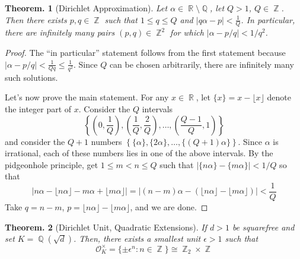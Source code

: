 \documentclass[11pt, a4paper]{memoir}
\DeclareMathOperator{\Q}{{\mathbb{Q}}}
\DeclareMathOperator{\Z}{{\mathbb{Z}}}
\DeclareMathOperator{\R}{{\mathbb{R}}}
\theoremstyle{change}
\newtheorem{theorem}{Theorem.}[section]
\theoremstyle{plain}
\theoremstyle{nonumberplain}
\newtheorem{proof}{Proof}
\numberwithin{equation}{section}
\begin{document}
\begin{theorem}[Dirichlet Approximation]\label{t:dir-approx}
    Let $\alpha\in\R\setminus\Q$, let $Q>1$, $Q\in\Z$.
    Then there exists $p,q\in\Z$ such that $1\leq q\leq Q$ and $|q\alpha-p|<\frac{1}{Q}$.
    In particular, there are infinitely many pairs $(p,q)\in\Z^2$ for which $|\alpha-p/q|<1/q^2$.
\end{theorem}
\begin{proof}
    The ``in particular'' statement follows from the first statement because $|\alpha-p/q|<\frac{1}{Qq}\leq\frac{1}{q^2}$.
    Since $Q$ can be chosen arbitrarily, there are infinitely many such solutions.

    Let's now prove the main statement.
    For any $x\in\R$, let $\{x\}=x-\lfloor x\rfloor$ denote the integer part of $x$.
    Consider the $Q$ intervals
    \begin{equation*}
        \left\{\left(0,\frac{1}{Q}\right),\left(\frac{1}{Q},\frac{2}{Q}\right),\ldots,\left(\frac{Q-1}{Q},1\right)\right\}
    \end{equation*}
    and consider the $Q+1$ numbers $\left\{\{\alpha\},\{2\alpha\},\ldots,\{(Q+1)\alpha\}\right\}$.
    Since $\alpha$ is irrational, each of these numbers lies in one of the above intervals.
    By the pidgeonhole principle, get $1\leq m<n\leq Q$ such that $|\{n\alpha\}-\{m\alpha\}|<1/Q$ so that
    \begin{equation*}
        \bigl\lvert n\alpha-\lfloor n\alpha\rfloor-m\alpha+\lfloor m\alpha\rfloor\bigr\rvert=\bigl\lvert(n-m)\alpha-(\lfloor n\alpha\rfloor-\lfloor m\alpha\rfloor)\bigr\rvert<\frac{1}{Q}
    \end{equation*}
    Take $q=n-m$, $p=\lfloor n\alpha\rfloor-\lfloor m\alpha\rfloor$, and we are done.
\end{proof}
\begin{theorem}[Dirichlet Unit, Quadratic Extensions]\label{t:dir-unit-q}
    If $d>1$ be squarefree and set $K=\Q(\sqrt{d})$.
    Then, there exists a smallest unit $\epsilon>1$ such that
    \begin{equation*}
        \mathcal{O}_K^\times=\{\pm\epsilon^n:n\in\Z\}\cong \Z_2\times\Z
    \end{equation*}
\end{theorem}
\end{document}
